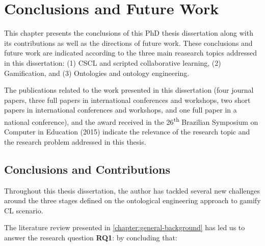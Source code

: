 \chapter{Conclusions and Future Work}
\label{chapter:conclusions} 

This chapter presents the conclusions of this PhD thesis dissertation along with its contributions as well as the directions of future work.
These conclusions and future work are indicated according to the three main reasearch topics addressed in this dissertation:
(1) CSCL and scripted collaborative learning,
(2) Gamification, and
(3) Ontologies and ontology engineering.

The publications related to the work presented in this dissertation (four journal papers, three full papers in international conferences and workshops, two short papers in international conferences and workshops, and one full paper in a national conference), and the award received in the 26\textsuperscript{th} Brazilian Symposium on Computer in Education (2015) indicate the relevance of the research topic and the research problem addressed in this thesis.

\section{Conclusions and Contributions}
\label{sec:conclusions-contributions}

Throughout this thesis dissertation, the author has tackled several new challenges around the three stages defined on the ontological engineering approach to gamify CL scenario.

The literature review presented in \autoref{chapter:general-background} has led us to answer the research question \textbf{RQ1}: 
 by concluding that:


